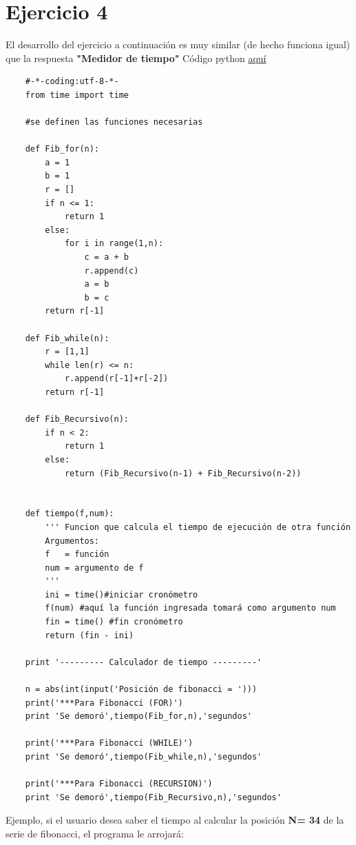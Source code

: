 \documentclass{article}
\begin{document}
\section{Ejercicio 4}
El desarrollo del ejercicio a continuación es muy similar (de hecho funciona igual) que la respuesta \textbf{"Medidor de tiempo"}
Código python \href{https://github.com/joescalona/Programacion-Astronomica/blob/master/Tarea\%205/tiempo_fibonacci.py}{aquí}
    \begin{verbatim}
    #-*-coding:utf-8-*-
    from time import time
    
    #se definen las funciones necesarias
    
    def Fib_for(n):
    	a = 1
    	b = 1
    	r = []
    	if n <= 1:
    		return 1 
    	else:
    		for i in range(1,n):
    			c = a + b
    			r.append(c) 
    			a = b
    			b = c
    	return r[-1] 
    
    def Fib_while(n):
    	r = [1,1] 
    	while len(r) <= n: 
    		r.append(r[-1]+r[-2])
    	return r[-1]
    
    def Fib_Recursivo(n):
    	if n < 2:
    		return 1
    	else: 
    		return (Fib_Recursivo(n-1) + Fib_Recursivo(n-2))
    
    
    def tiempo(f,num):
    	''' Funcion que calcula el tiempo de ejecución de otra función
    	Argumentos:
    	f   = función
    	num = argumento de f
    	'''
    	ini = time()#iniciar cronómetro
    	f(num) #aquí la función ingresada tomará como argumento num
    	fin = time() #fin cronómetro 
    	return (fin - ini) 
    
    print '--------- Calculador de tiempo ---------'
    
    n = abs(int(input('Posición de fibonacci = ')))
    print('***Para Fibonacci (FOR)') 
    print 'Se demoró',tiempo(Fib_for,n),'segundos'
    
    print('***Para Fibonacci (WHILE)') 
    print 'Se demoró',tiempo(Fib_while,n),'segundos'
    
    print('***Para Fibonacci (RECURSION)') 
    print 'Se demoró',tiempo(Fib_Recursivo,n),'segundos'
    \end{verbatim}
    
    \noindent
    Ejemplo, si el usuario desea saber el tiempo al calcular la posición \textbf{N= 34} de la serie de fibonacci, el programa le arrojará:
    
\end{document}
